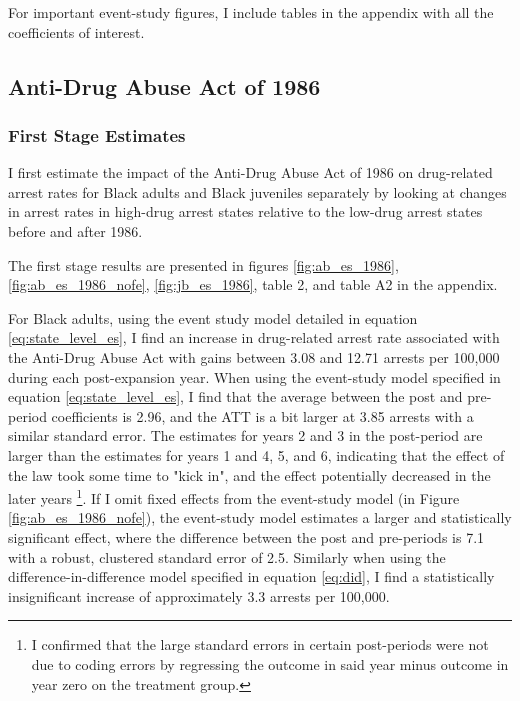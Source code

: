 \documentclass{article}
\begin{document}
For important event-study figures, I include tables in the appendix with all the coefficients of interest.

\subsection{Anti-Drug Abuse Act of 1986}

\subsubsection{First Stage Estimates}

I first estimate the impact of the Anti-Drug Abuse Act of 1986 on drug-related arrest rates for Black adults and Black juveniles separately by looking at changes in arrest rates in high-drug arrest states relative to the low-drug arrest states before and after 1986.

The first stage results are presented in figures \ref{fig:ab_es_1986}, \ref{fig:ab_es_1986_nofe}, \ref{fig:jb_es_1986}, table 2, and table A2 in the appendix. 

For Black adults, using the event study model detailed in equation \ref{eq:state_level_es}, I find an increase in drug-related arrest rate associated with the Anti-Drug Abuse Act with gains between 3.08 and 12.71 arrests per 100,000 during each post-expansion year. When using the event-study model specified in equation \ref{eq:state_level_es}, I find that the average between the post and pre-period coefficients is 2.96, and the ATT is a bit larger at 3.85 arrests with a similar standard error. The estimates for years 2 and 3 in the post-period are larger than the estimates for years 1 and 4, 5, and 6, indicating that the effect of the law took some time to "kick in", and the effect potentially decreased in the later years \footnote{I confirmed that the large standard errors in certain post-periods were not due to coding errors by regressing the outcome in said year minus outcome in year zero on the treatment group.}. If I omit fixed effects from the event-study model (in Figure \ref{fig:ab_es_1986_nofe}), the event-study model estimates a larger and statistically significant effect, where the difference between the post and pre-periods is 7.1 with a robust, clustered standard error of 2.5. Similarly when using the difference-in-difference model specified in equation \ref{eq:did}, I find a statistically insignificant increase of approximately 3.3 arrests per 100,000. 
\end{document}
